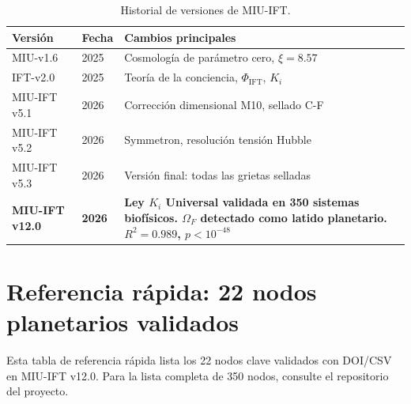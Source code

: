 \documentclass[12pt, a4paper]{article}
\theoremstyle{miuThm}
\theoremstyle{remark}
\newcommand{\Rtwo}{0.989}
\begin{document}
\begin{table}[h!]
\centering
\caption{Historial de versiones de MIU-IFT.}
\label{tab:versiones}
\begin{tabular}{lll}
\toprule
\textbf{Versión} & \textbf{Fecha} & \textbf{Cambios principales} \\
\midrule
MIU-v1.6 & 2025 & Cosmología de parámetro cero, $\xi=8.57$ \\
IFT-v2.0 & 2025 & Teoría de la conciencia, $\Phi_{\text{IFT}}$, $K_i$ \\
MIU-IFT v5.1 & 2026 & Corrección dimensional M10, sellado C-F \\
MIU-IFT v5.2 & 2026 & Symmetron, resolución tensión Hubble \\
MIU-IFT v5.3 & 2026 & Versión final: todas las grietas selladas \\
\textbf{MIU-IFT v12.0} & \textbf{2026} & \textbf{Ley $K_i$ Universal validada en 350 sistemas biofísicos. $\Omega_F$ detectado como latido planetario. $R^2=\Rtwo$, $p<10^{-48}$} \\
\bottomrule
\end{tabular}
\end{table}

\clearpage
\section{Referencia rápida: 22 nodos planetarios validados}
\label{app:nodos_planetarios_2}

Esta tabla de referencia rápida lista los 22 nodos clave validados con DOI/CSV en MIU-IFT v12.0. Para la lista completa de 350 nodos, consulte el repositorio del proyecto.
\end{document}
